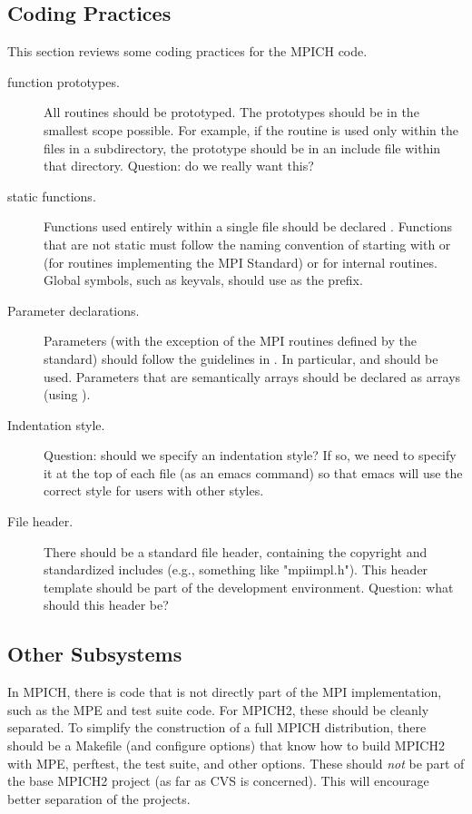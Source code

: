 \documentclass{article}
\begin{document}
\subsection{Coding Practices}
This section reviews some coding practices for the MPICH code.

\begin{description}
\item[function prototypes.]
All routines should be prototyped.  The prototypes should be in the
smallest scope possible.  For example, if the routine is used only
within the files in a subdirectory, the prototype should be in an
include file within that directory.
Question: do we really want this?

\item[static functions.]
Functions used entirely within a single file should be declared
.  Functions that are not static must follow the naming
convention of starting with  or  (for routines
implementing the MPI Standard) or  for internal routines.  
Global symbols, such as keyvals, should use  as the
prefix.  

\item[Parameter declarations.]
Parameters (with the exception of the MPI routines defined by the
standard) should follow the guidelines in .  In
particular,  and  should be used.
Parameters that are semantically arrays should be declared as arrays
(using \code{[]}).  

\item[Indentation style.]
Question: should we specify an indentation style?  If so, we need to
specify it at the top of each file (as an emacs command) so that emacs
will use the correct style for users with other styles.

\item[File header.]
There should be a standard file header, containing the copyright and
standardized includes (e.g., something like "mpiimpl.h").  This header
template should be part of the development environment.  Question:
what should this header be?

\end{description}

\subsection{Other Subsystems}
In MPICH, there is code that is not directly part of the MPI
implementation, such as the MPE and test suite code.  For MPICH2,
these should be cleanly separated.  To simplify the construction of a
full MPICH distribution, there should be a Makefile (and configure
options) that know how to build MPICH2 with MPE, perftest, the test
suite, and other options.  These should \emph{not} be part of the base
MPICH2 project (as far as CVS is concerned).  This will encourage
better separation of the projects.
\end{document}
